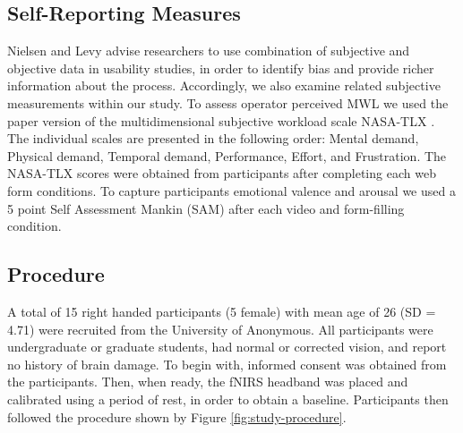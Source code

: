 \documentclass[../main/Feedback.tex]{subfiles}
\begin{document}
\subsection{Self-Reporting Measures}
Nielsen and Levy \cite{nielsen1994measuring} advise researchers to use combination of subjective and objective data in usability studies, in order to identify bias and provide richer information about the process. Accordingly, we also examine related subjective measurements within our study. To assess operator perceived MWL we used the paper version of the multidimensional subjective workload scale NASA-TLX \cite{nasatlx}.
The individual scales are presented in the following order: Mental demand, Physical demand, Temporal demand, Performance, Effort, and Frustration.
The NASA-TLX scores were obtained from participants after completing each web form conditions. To capture participants emotional valence and arousal we used a 5 point Self Assessment Mankin (SAM) \cite{bradley1994measuring} after each video and form-filling condition.


\subsection{Procedure}
A total of 15 right handed participants (5 female) with mean age of 26 (SD = 4.71) were recruited from the University of Anonymous.
All participants were undergraduate or graduate students, had normal or corrected vision, and report no history of brain damage. %
To begin with, informed consent was obtained from the participants. Then, when ready, the fNIRS headband was placed and calibrated using a period of rest, in order to obtain a baseline. Participants then followed the procedure shown by Figure \ref{fig:study-procedure}.
\end{document}
